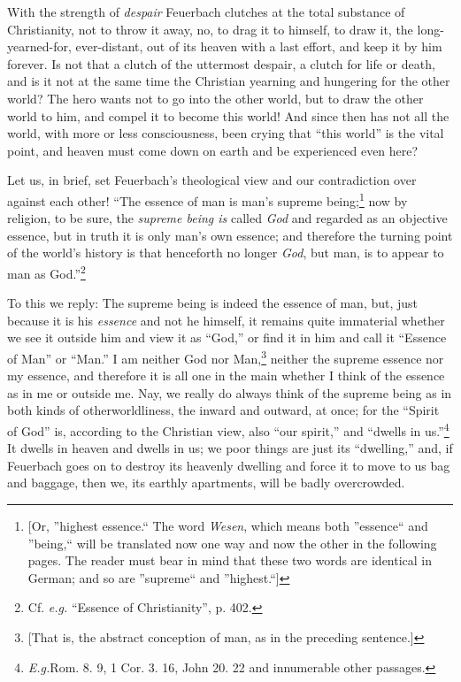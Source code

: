 With the strength of \textit{despair} Feuerbach clutches at the total 
substance of Christianity, not to throw it away, no, to drag it to himself, to 
draw it, the long-yearned-for, ever-distant, out of its heaven with a last 
effort, and keep it by him forever. Is not that a clutch of the uttermost 
despair, a clutch for life or death, and is it not at the same time the 
Christian yearning and hungering for the other world? The hero wants not to go 
into the other world, but to draw the other world to him, and compel it to 
become this world! And since then has not all the world, with more or less 
consciousness, been crying that ``this world'' is the vital point, and 
heaven must come down on earth and be experienced even here?

Let us, in brief, set Feuerbach's theological view and our contradiction over 
against each other! ``The essence of man is man's supreme 
being;\footnote{[Or, ''highest essence.`` The word \textit{Wesen}, which 
means both ''essence`` and ''being,`` will be translated now one way and 
now the other in the following pages. The reader must bear in mind that these 
two words are identical in German; and so are ''supreme`` and 
''highest.``]} now by religion, to be sure, the \textit{supreme being is} 
called \textit{God} and regarded as an objective essence, but in truth it is 
only man's own essence; and therefore the turning point of the world's history 
is that henceforth no longer \textit{God}, but man, is to appear to man as 
God.''\footnote{Cf. \textit{e.g.} ``Essence of Christianity'', p. 402.}

To this we reply: The supreme being is indeed the essence of man, but, just 
because it is his \textit{essence} and not he himself, it remains quite 
immaterial whether we see it outside him and view it as ``God,'' or find it 
in him and call it ``Essence of Man'' or ``Man.'' I am neither God nor 
Man,\footnote{[That is, the abstract conception of man, as in the preceding 
sentence.]} neither the supreme essence nor my essence, and therefore it is 
all one in the main whether I think of the essence as in me or outside me. 
Nay, we really do always think of the supreme being as in both kinds of 
otherworldliness, the inward and outward, at once; for the ``Spirit of God'' 
is, according to the Christian view, also ``our spirit,'' and ``dwells in 
us.''\footnote{\textit{E.g.}Rom. 8. 9, 1 Cor. 3. 16, John 20. 22 and 
innumerable other passages.} It dwells in heaven and dwells in us; we poor 
things are just its ``dwelling,'' and, if Feuerbach goes on to destroy its 
heavenly dwelling and force it to move to us bag and baggage, then we, its 
earthly apartments, will be badly overcrowded.

